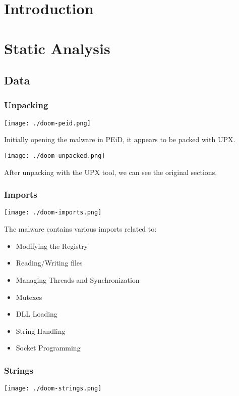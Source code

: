 \documentclass[11pt]{article}
\date{\today}
\title{}
\begin{document}
\tableofcontents

\section{Introduction}
\label{sec:orgbc00847}
\section{Static Analysis}
\label{sec:org76302ca}
\subsection{Data}
\label{sec:org260927d}
\subsubsection{Unpacking}
\label{sec:org96c493b}
\begin{center}
\texttt{[image: ./doom-peid.png]}
\end{center}

Initially opening the malware in PEiD, it appears to be packed with
UPX.

\begin{center}
\texttt{[image: ./doom-unpacked.png]}
\end{center}

After unpacking with the UPX tool, we can see the original sections.
\subsubsection{Imports}
\label{sec:org1987a59}
\begin{center}
\texttt{[image: ./doom-imports.png]}
\end{center}

The malware contains various imports related to:
\begin{itemize}
\item Modifying the Registry
\item Reading/Writing files
\item Managing Threads and Synchronization
\item Mutexes
\item DLL Loading
\item String Handling
\item Socket Programming
\end{itemize}
\subsubsection{Strings}
\label{sec:org9c81627}
\begin{center}
\texttt{[image: ./doom-strings.png]}
\end{center}
\end{document}
